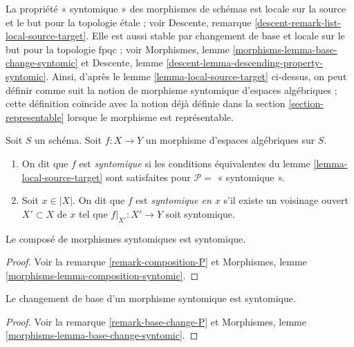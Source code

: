 \noindent
La propriété « syntomique » des morphismes de schémas est
locale sur la source et le but pour la topologie étale ; voir
Descente, remarque \ref{descent-remark-list-local-source-target}.
Elle est aussi stable par changement de base et locale sur le but pour la topologie fpqc ; voir
Morphismes, lemme \ref{morphisms-lemma-base-change-syntomic} et
Descente, lemme \ref{descent-lemma-descending-property-syntomic}.
Ainsi, d'après le
lemme \ref{lemma-local-source-target}
ci-dessus, on peut définir comme suit la notion de morphisme syntomique d'espaces
algébriques ; cette définition coïncide avec la notion déjà définie dans la
section \ref{section-representable}
lorsque le morphisme est représentable.

\begin{definition}
\label{definition-syntomic}
Soit $S$ un schéma.
Soit $f : X \to Y$ un morphisme d'espaces algébriques sur $S$.
\begin{enumerate}
\item On dit que $f$ est {\it syntomique} si les conditions équivalentes du
lemme \ref{lemma-local-source-target}
sont satisfaites pour $\mathcal{P} =$ « syntomique ».
\item Soit $x \in |X|$. On dit que $f$ est {\it syntomique en $x$} s'il
existe un voisinage ouvert $X' \subset X$ de $x$ tel
que $f|_{X'} : X' \to Y$ soit syntomique.
\end{enumerate}
\end{definition}

\begin{lemma}
\label{lemma-composition-syntomic}
Le composé de morphismes syntomiques est syntomique.
\end{lemma}

\begin{proof}
Voir la remarque \ref{remark-composition-P} et
Morphismes, lemme \ref{morphisms-lemma-composition-syntomic}.
\end{proof}

\begin{lemma}
\label{lemma-base-change-syntomic}
Le changement de base d'un morphisme syntomique est syntomique.
\end{lemma}

\begin{proof}
Voir la remarque \ref{remark-base-change-P} et
Morphismes, lemme \ref{morphisms-lemma-base-change-syntomic}.
\end{proof}

